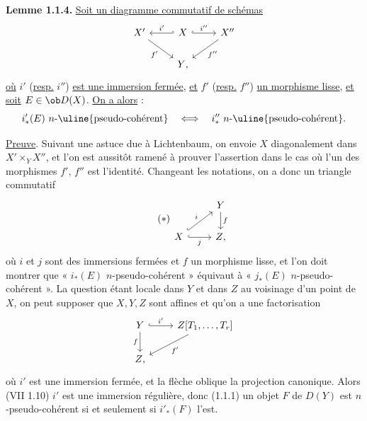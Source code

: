 \textbf{Lemme 1.1.4.}
\uline{Soit un diagramme commutatif de schémas}
\[
\begin{tikzcd}
X' \arrow[dr,"f'"'] & X \arrow[l,hook',"i'"'] \arrow[r,hook,"i''"] & X'' \arrow[dl,"f''"]\\
& Y{,} &
\end{tikzcd}
\]
\uline{où} \(i'\) (\uline{resp.} \(i''\)) \uline{est une immersion fermée}, \uline{et} \(f'\) (\uline{resp.} \(f''\)) \uline{un morphisme lisse}, \uline{et soit} \(E\in\ob D(X)\). \uline{On a alors} :
\[
  i'_*(E)\ n\text{-\uline{pseudo-cohérent}}
  \quad\Longleftrightarrow\quad
  i''_*\ n\text{-\uline{pseudo-cohérent}}.
\]

\uline{Preuve}. Suivant une astuce due à Lichtenbaum, on envoie \(X\) diagonalement dans \(X'\times_YX''\), et l'on est aussitôt ramené à prouver l'assertion dans le cas où l'un des morphismes \(f'\), \(f''\) est l'identité. Changeant les notations, on a donc un triangle commutatif
\begin{equation}\tag{$*$}
\begin{tikzcd}
& Y \arrow[d,"f"]\\
X \arrow[r,hook,"j"'] \arrow[ur,hook,"i"] & Z{,}
\end{tikzcd}
\end{equation}
où \(i\) et \(j\) sont des immersions fermées et \(f\) un morphisme lisse, et l'on doit montrer que « \(i_*(E)\) \(n\)-pseudo-cohérent » équivaut à « \(j_*(E)\) \(n\)-pseudo-cohérent ». La question étant locale dans \(Y\) et dans \(Z\) au voisinage d'un point de \(X\), on peut supposer que \(X,Y,Z\) sont affines et qu'on a une factorisation
\[
\begin{tikzcd}
Y \arrow[r,hook,"i'"] \arrow[d,"f"'] & Z[T_1,\ldots,T_r]\arrow[dl,"f'"]\\
Z{,}&
\end{tikzcd}
\]
où \(i'\) est une immersion fermée, et la flèche oblique la projection canonique. Alors (VII 1.10) \(i'\) est une immersion régulière, donc (1.1.1) un objet \(F\) de \(D(Y)\) est \(n\)-pseudo-cohérent si et seulement si \(i'_*(F)\) l'est.

